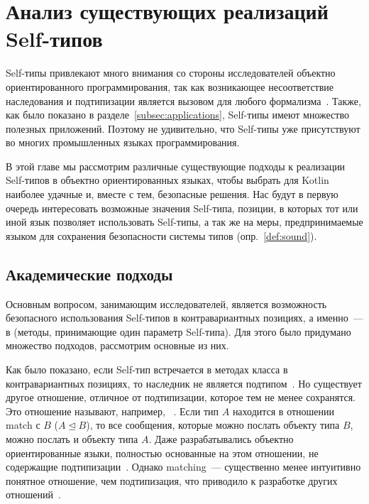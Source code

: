 \section{Анализ существующих реализаций Self-типов} \label{sec:impls}

Self-типы привлекают много внимания со стороны исследователей объектно ориентированного программирования, так как возникающее несоответствие наследования и подтипизации является вызовом для любого формализма~\cite{cook1989inheritance}.
Также, как было показано в разделе~\ref{subsec:applications}, Self-типы имеют множество полезных приложений.
Поэтому не удивительно, что Self-типы уже присутствуют во многих промышленных языках программирования.

В этой главе мы рассмотрим различные существующие подходы к реализации Self-типов в объектно ориентированных языках, чтобы выбрать для Kotlin наиболее удачные и, вместе с тем, безопасные решения.
Нас будут в первую очередь интересовать возможные значения Self-типа, позиции, в которых тот или иной язык позволяет использовать Self-типы, а так же на меры, предпринимаемые языком для сохранения безопасности системы типов (опр.~\ref{def:sound}).


\subsection{Академические подходы} \label{subsec:academic-approaches}

Основным вопросом, занимающим исследователей, является возможность безопасного использования Self-типов в контравариантных позициях, а именно~--- в  (методы, принимающие один параметр Self-типа).
Для этого было придумано множество подходов, рассмотрим основные из них.

Как было показано, если Self-тип встречается в методах класса в контравариантных позициях, то наследник не является подтипом~\cite{cook1989inheritance}.
Но существует другое отношение, отличное от подтипизации, которое тем не менее сохранятся.
Это отношение называют, например, ~\cite{bruce1993safe}.
Если тип $A$ находится в отношении match с $B$ ($A \trianglelefteq B$), то все сообщения, которые можно послать объекту типа $B$, можно послать и объекту типа $A$.
Даже разрабатывались объектно ориентированные языки, полностью основанные на этом отношении, не содержащие подтипизации~\cite{bruce1997subtyping}.
Однако matching~--- существенно менее интуитивно понятное отношение, чем подтипизация, что приводило к разработке других отношений~\cite{ryu2016thistype}.

